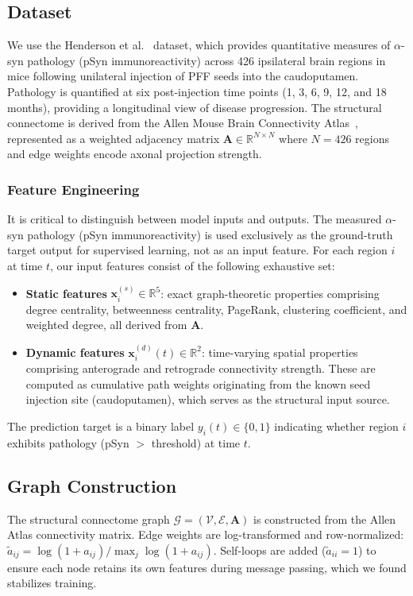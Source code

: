 \documentclass[conference]{IEEEtran}
\begin{document}
\subsection{Dataset}
We use the Henderson et al.~\cite{henderson2019spread} dataset, which provides quantitative measures of $\alpha$-syn pathology (pSyn immunoreactivity) across 426 ipsilateral brain regions in mice following unilateral injection of PFF seeds into the caudoputamen. Pathology is quantified at six post-injection time points (1, 3, 6, 9, 12, and 18 months), providing a longitudinal view of disease progression. The structural connectome is derived from the Allen Mouse Brain Connectivity Atlas~\cite{oh2014mesoscale}, represented as a weighted adjacency matrix $\mathbf{A} \in \mathbb{R}^{N \times N}$ where $N = 426$ regions and edge weights encode axonal projection strength.

\subsubsection{Feature Engineering}
It is critical to distinguish between model inputs and outputs. The measured $\alpha$-syn pathology (pSyn immunoreactivity) is used exclusively as the ground-truth target output for supervised learning, not as an input feature. For each region $i$ at time $t$, our input features consist of the following exhaustive set:
\begin{itemize}
    \item \textbf{Static features} $\mathbf{x}_i^{(s)} \in \mathbb{R}^{5}$: exact graph-theoretic properties comprising degree centrality, betweenness centrality, PageRank, clustering coefficient, and weighted degree, all derived from $\mathbf{A}$.
    \item \textbf{Dynamic features} $\mathbf{x}_i^{(d)}(t) \in \mathbb{R}^{2}$: time-varying spatial properties comprising anterograde and retrograde connectivity strength. These are computed as cumulative path weights originating from the known seed injection site (caudoputamen), which serves as the structural input source.
\end{itemize}
The prediction target is a binary label $y_i(t) \in \{0, 1\}$ indicating whether region $i$ exhibits pathology (pSyn $>$ threshold) at time $t$.

\subsection{Graph Construction}
The structural connectome graph $\mathcal{G} = (\mathcal{V}, \mathcal{E}, \mathbf{A})$ is constructed from the Allen Atlas connectivity matrix. Edge weights are log-transformed and row-normalized: $\tilde{a}_{ij} = \log(1 + a_{ij}) / \max_j \log(1 + a_{ij})$. Self-loops are added ($\tilde{a}_{ii} = 1$) to ensure each node retains its own features during message passing, which we found stabilizes training.
\end{document}
